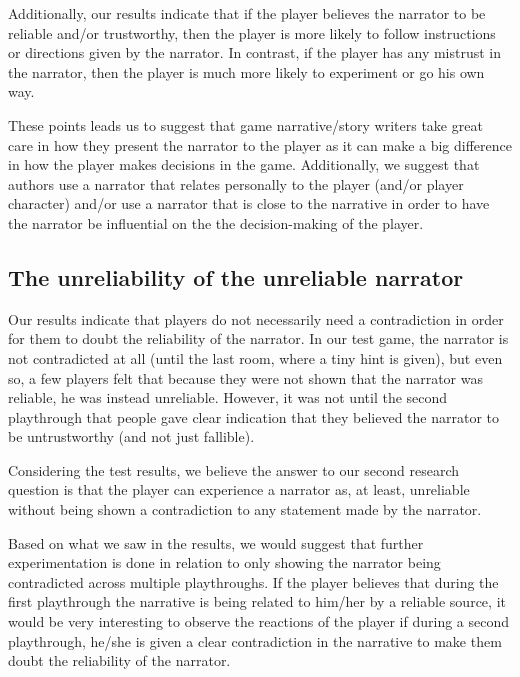 Additionally, our results indicate that if the player believes the narrator to be reliable and/or trustworthy, then the player is more likely to follow instructions or directions given by the narrator. In contrast, if the player has any mistrust in the narrator, then the player is much more likely to experiment or go his own way.

These points leads us to suggest that game narrative/story writers take great care in how they present the narrator to the player as it can make a big difference in how the player makes decisions in the game. Additionally, we suggest that authors use a narrator that relates personally to the player (and/or player character) and/or use a narrator that is close to the narrative in order to have the narrator be influential on the the decision-making of the player.
\subsection{The unreliability of the unreliable narrator}
Our results indicate that players do not necessarily need a contradiction in order for them to doubt the reliability of the narrator. In our test game, the narrator is not contradicted at all (until the last room, where a tiny hint is given), but even so, a few players felt that because they were not shown that the narrator was reliable, he was instead unreliable. However, it was not until the second playthrough that people gave clear indication that they believed the narrator to be untrustworthy (and not just fallible).

Considering the test results, we believe the answer to our second research question is that the player can experience a narrator as, at least, unreliable without being shown a contradiction to any statement made by the narrator.

Based on what we saw in the results, we would suggest that further experimentation is done in relation to only showing the narrator being contradicted across multiple playthroughs. If the player believes that during the first playthrough the narrative is being related to him/her by a reliable source, it would be very interesting to observe the reactions of the player if during a second playthrough, he/she is given a clear contradiction in the narrative to make them doubt the reliability of the narrator.